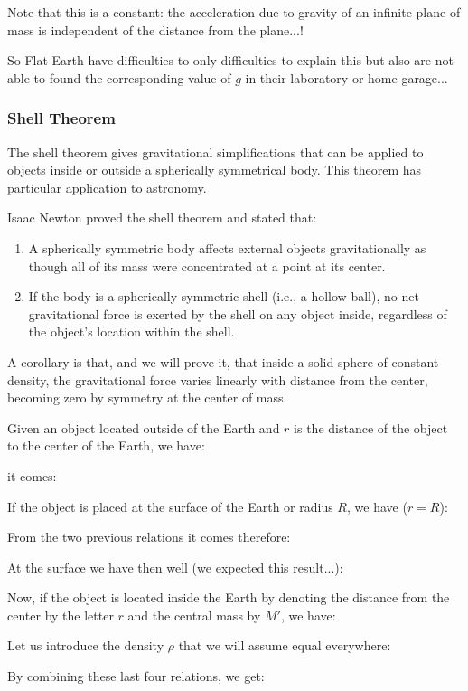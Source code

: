 	Note that this is a constant: the acceleration due to gravity of an infinite plane of mass is independent of the distance from the plane...!

	So Flat-Earth have difficulties to only difficulties to explain this but also are not able to found the corresponding value of $g$ in their laboratory or home garage...

	\subsubsection{Shell Theorem}
	The shell theorem gives gravitational simplifications that can be applied to objects inside or outside a spherically symmetrical body. This theorem has particular application to astronomy.

	Isaac Newton proved the shell theorem and stated that:
	\begin{enumerate}
		\item A spherically symmetric body affects external objects gravitationally as though all of its mass were concentrated at a point at its center.
		\item If the body is a spherically symmetric shell (i.e., a hollow ball), no net gravitational force is exerted by the shell on any object inside, regardless of the object's location within the shell.
	\end{enumerate}
	A corollary is that, and we will prove it, that inside a solid sphere of constant density, the gravitational force varies linearly with distance from the center, becoming zero by symmetry at the center of mass.
	
	Given an object located outside of the Earth and $r$ is the distance of the object to the center of the Earth, we have:
	
	it comes:
	
	If the object is placed at the surface of the Earth or radius $R$, we have ($r=R$):
	
	From the two previous relations it comes therefore:
	
	At the surface we have then well (we expected this result...):
	
	Now, if the object is located inside the Earth by denoting the distance from the center by the letter $r$ and the central mass by $M'$, we have:
	
	Let us introduce the density $\rho$ that we will assume equal everywhere:
	
	By combining these last four relations, we get:
	
